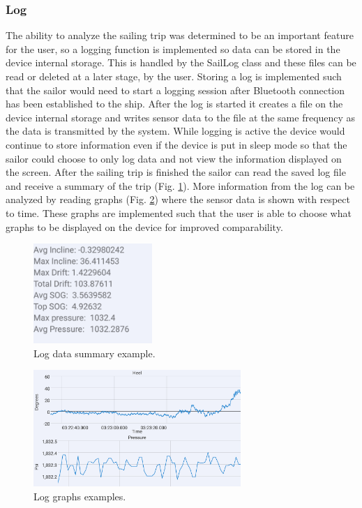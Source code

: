 \subsubsection{Log}
The ability to analyze the sailing trip was determined to be an important feature for the user, so a logging function is implemented so data can be stored in the device internal storage. This is handled by the SailLog class and these files can be read or deleted at a later stage, by the user. Storing a log is implemented such that the sailor would need to start a logging session after Bluetooth connection has been established to the ship. After the log is started it creates a file on the device internal storage and writes sensor data to the file at the same frequency as the data is transmitted by the system. While logging is active the device would continue to store information even if the device is put in sleep mode so that the sailor could choose to only log data and not view the information displayed on the screen. After the sailing trip is finished the sailor can read the saved log file and receive a summary of the trip (Fig. \ref{log-summary}). More information from the log can be analyzed by reading graphs (Fig. \ref{log-graph}) where the sensor data is shown with respect to time. These graphs are implemented such that the user is able to choose what graphs to be displayed on the device for improved comparability.
\begin{figure}[H]
\centering
\includegraphics[width=0.4\textwidth]{Figures/log_data.png}
\caption{Log data summary example.}
\label{log-summary}
\end{figure}
\begin{figure}[H]
\centering
\includegraphics[width=0.7\textwidth]{Figures/log_graph.png}
\caption{Log graphs examples.}
\label{log-graph}
\end{figure}

